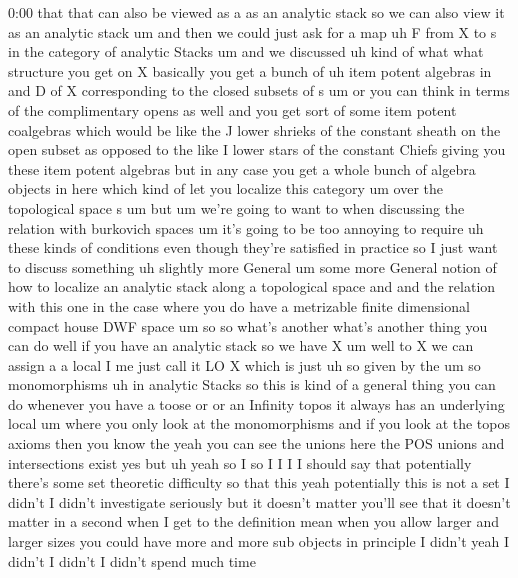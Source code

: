 \begin{unfinished}{0:00}
that  that  can  also  be  viewed  as  a  as  an
analytic  stack  so  we  can  also  view  it  as
an  analytic  stack  um  and  then  we  could
just  ask  for  a  map  uh  F  from  X  to  s  in
the  category  of  analytic
Stacks  um  and  we  discussed  uh  kind  of
what  what  structure  you  get  on  X
basically  you  get  a  bunch  of  uh  item
potent  algebras  in
and  D  of  X  corresponding  to  the  closed
subsets  of  s  um  or  you  can  think  in
terms  of  the  complimentary  opens  as  well
and  you  get  sort  of  some  item  potent
coalgebras  which  would  be  like  the  J
lower  shrieks  of  the  constant  sheath  on
the  open  subset  as  opposed  to  the  like  I
lower  stars  of  the  constant  Chiefs
giving  you  these  item  potent  algebras
but  in  any  case  you  get  a  whole  bunch  of
algebra  objects  in  here  which  kind  of
let  you  localize  this  category  um  over
the  topological  space  s
um  but  um  we're  going  to  want  to  when
discussing  the  relation  with  burkovich
spaces  um  it's  going  to  be  too  annoying
to  require  uh  these  kinds  of  conditions
even  though  they're  satisfied  in
practice  so  I  just  want  to  discuss
something  uh  slightly  more  General  um
some  more  General  notion  of  how  to
localize  an  analytic  stack  along  a
topological  space  and  and  the  relation
with  this  one  in  the  case  where  you  do
have  a  metrizable  finite  dimensional
compact  house  DWF  space
um  so  so  what's  another  what's  another
thing  you  can  do  well  if  you  have  an
analytic  stack  so  we  have  X  um  well  to  X
we  can  assign  a  a
local  I  me  just  call  it  LO
X  which  is  just  uh  so  given  by  the
um  so
monomorphisms
uh  in  analytic
Stacks  so  this  is  kind  of  a  general
thing  you  can  do  whenever  you  have  a
toose  or  or  an  Infinity  topos  it  always
has  an  underlying  local  um  where  you
only  look  at  the
monomorphisms  and  if  you  look  at  the
topos  axioms  then  you  know  the  yeah  you
can  see  the
unions  here  the  POS  unions  and
intersections  exist  yes  but  uh  yeah  so  I
so  I  I  I  I  should  say  that  potentially
there's  some  set  theoretic  difficulty  so
that
this  yeah  potentially  this  is  not  a  set
I  didn't  I  didn't  investigate  seriously
but  it  doesn't  matter  you'll  see  that  it
doesn't  matter  in  a  second  when  I  get  to
the  definition  mean  when  you  allow
larger  and  larger  sizes  you  could  have
more  and  more  sub  objects  in  principle  I
didn't  yeah  I
didn't  I  didn't  I  didn't  spend  much  time

\end{unfinished}

